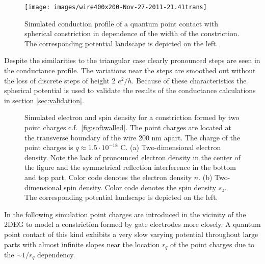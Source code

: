 \begin{figure}[h]
\centering
\texttt{[image: images/wire400x200-Nov-27-2011-21.41trans]}
\caption{Simulated conduction profile of a quantum point contact with spherical constriction in dependence of the width of the constriction. The corresponding potential landscape is depicted on the left.}\label{fig:sphericaltrans}
\end{figure}
Despite the similarities to the triangular case clearly pronounced steps are seen in the conductance profile. The variations near the steps are smoothed out without the loss of discrete steps of height 2 $e^2/h$. Because of these characteristics the spherical potential is used to validate the results of the conductance calculations in section \ref{sec:validation}.\par
\begin{figure}[h]
\caption{Simulated electron and spin density for a constriction formed by two point charges c.f.~\cref{fig:softwalled}. The point charges are located at the transverse boundary of the wire 200 nm apart. The charge of the point charges is $q\approx 1.5\cdot 10^{-18}$ C. (a) Two-dimensional electron density. Note the lack of pronounced electron density in the center of the figure and the symmetrical reflection interference in the bottom and top part. Color code denotes the electron density $n$. (b) Two-dimensional spin density. Color code denotes the spin density $s_z$. The corresponding potential landscape is depicted on the left.}
\end{figure}
In the following simulation point charges are introduced in the vicinity of the 2DEG to model a constriction formed by gate electrodes more closely. A quantum point contact of this kind exhibits a very slow varying potential throughout large parts with almost infinite slopes near the location $r_q$ of the point charges due to the $\sim 1/r_q$ dependency.\par
